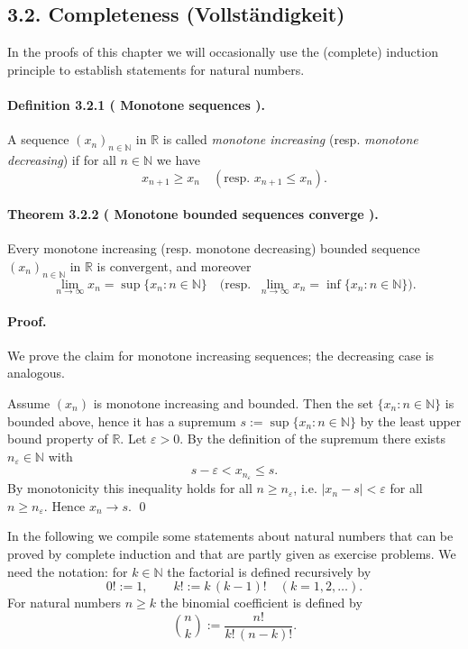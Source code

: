 \documentclass[12pt]{article}
\newcommand{\N}{\mathbb{N}}
\newcommand{\R}{\mathbb{R}}
\newcommand{\eps}{\varepsilon}
\newcommand{\NumberedDefinition}[3]{%
\paragraph*{Definition #1 ( #2 ).} #3\par}
\newcommand{\NumberedTheorem}[3]{%
\paragraph*{Theorem #1 ( #2 ).} #3\par}
\begin{document}
\subsection*{3.2. Completeness (Vollständigkeit)}

In the proofs of this chapter we will occasionally use the (complete) induction principle to establish statements for natural numbers.

\NumberedDefinition{3.2.1}{Monotone sequences}{A sequence $(x_n)_{n\in\N}$ in $\R$ is called \emph{monotone increasing} (resp. \emph{monotone decreasing}) if for all $n\in\N$ we have
\[
	x_{n+1} \ge x_n \quad (\text{resp. } x_{n+1} \le x_n ).
\]}

\NumberedTheorem{3.2.2}{Monotone bounded sequences converge}{Every monotone increasing (resp. monotone decreasing) bounded sequence $(x_n)_{n\in\N}$ in $\R$ is convergent, and moreover
\[
	\lim_{n\to\infty} x_n = \sup\{x_n : n\in\N\} \quad\big(\text{resp. }\ \lim_{n\to\infty} x_n = \inf\{x_n : n\in\N\}\big).
\]}

\paragraph{Proof.} We prove the claim for monotone increasing sequences; the decreasing case is analogous.

Assume $(x_n)$ is monotone increasing and bounded. Then the set $\{x_n : n\in\N\}$ is bounded above, hence it has a supremum $s:=\sup\{x_n : n\in\N\}$ by the least upper bound property of $\R$. Let $\eps>0$. By the definition of the supremum there exists $n_\eps\in\N$ with
\[
	s-\eps < x_{n_\eps} \le s.
\]
By monotonicity this inequality holds for all $n\ge n_\eps$, i.e. $|x_n-s|<\eps$ for all $n\ge n_\eps$. Hence $x_n\to s$.
\qed

\bigskip

In the following we compile some statements about natural numbers that can be proved by complete induction and that are partly given as exercise problems. We need the notation: for $k\in\N$ the factorial is defined recursively by
\[
    0! := 1, \qquad k! := k\,(k-1)! \quad (k=1,2,\dots).
\]
For natural numbers $n\ge k$ the binomial coefficient is defined by
\[
    \binom{n}{k} := \frac{n!}{k!\,(n-k)!}.
\]
\end{document}
